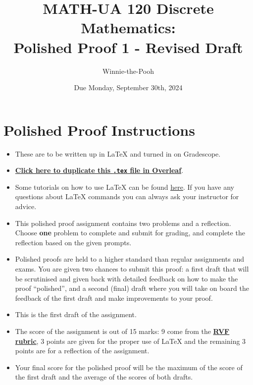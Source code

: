 \documentclass{article}
\title{\textbf{MATH-UA 120 Discrete Mathematics: \\ Polished Proof 1 - Revised Draft}}
\author{%
    Winnie-the-Pooh %
}
\date{Due Monday, September 30th, 2024} %
\theoremstyle{definition}
\begin{document}
\maketitle %

\vfill


\section*{Polished Proof Instructions}

\begin{itemize}
    \item These are to be written up in \LaTeX{} and turned in on Gradescope.
    \item \href{https://bit.ly/3TJfkTp}{\textbf{Click here to duplicate this \texttt{.tex} file in Overleaf}}.
    \item Some tutorials on how to use \LaTeX{} can be found \href{https://www.overleaf.com/learn/latex/Tutorials}{\underline{here}}. If you have any questions about \LaTeX{} commands you can always ask your instructor for advice.
    \item This polished proof assignment contains two problems and a reflection. Choose \textbf{one} problem to complete and submit for grading, and complete the reflection based on the given prompts.
    \item Polished proofs are held to a higher standard than regular assignments and exams. You are given two chances to submit this proof: a first draft that will be scrutinised and given back with detailed feedback on how to make the proof ``polished'', and a second (final) draft where you will take on board the feedback of the first draft and make improvements to your proof.
    \item This is the first draft of the assignment.
    \item The score of the assignment is out of 15 marks: 9 come from the \href{https://drive.google.com/file/d/1YZhhGv5OyPdx0-VDa6i6cftkzPromMRY/view?usp=drive_link}{\textbf{RVF rubric}}, 3 points are given for the proper use of \LaTeX{} and the remaining 3 points are for a reflection of the assignment.
    \item Your final score for the polished proof will be the maximum of the score of the first draft and the average of the scores of both drafts.
\end{itemize}
\end{document}
